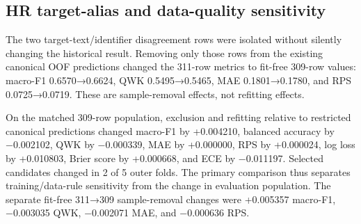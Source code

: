 \documentclass[information,article,submit,pdftex,moreauthors]{Definitions/mdpi}
\begin{document}
\begin{table}[H]
\centering\scriptsize
\caption{HR target-mapping and CV-design sensitivity}
\label{tab:10}
\end{table}

\subsection{HR target-alias and data-quality sensitivity}

The two target-text/identifier disagreement rows were isolated without silently changing the historical result. Removing only those rows from the existing canonical OOF predictions changed the 311-row metrics to fit-free 309-row values: macro-F1 0.6570→0.6624, QWK 0.5495→0.5465, MAE 0.1801→0.1780, and RPS 0.0725→0.0719. These are sample-removal effects, not refitting effects.

On the matched 309-row population, exclusion and refitting relative to restricted canonical predictions changed macro-F1 by +0.004210, balanced accuracy by −0.002102, QWK by −0.000339, MAE by +0.000000, RPS by +0.000024, log loss by +0.010803, Brier score by +0.000668, and ECE by −0.011197. Selected candidates changed in 2 of 5 outer folds. The primary comparison thus separates training/data-rule sensitivity from the change in evaluation population. The separate fit-free 311→309 sample-removal changes were +0.005357 macro-F1, −0.003035 QWK, −0.002071 MAE, and −0.000636 RPS.
\end{document}
